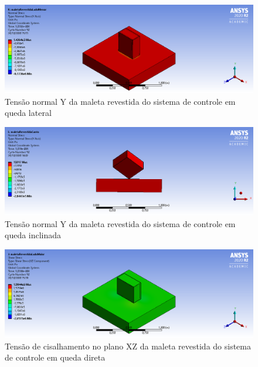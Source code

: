 \begin{apendicesenv}
\begin{figure}[htb]
    \centering
    \includegraphics[width=1.0\textwidth, angle=0]{figuras/estrutura_simulacaoImpacto/maletaRevestidaNormalYMenor.png}
    \caption{Tensão normal Y da maleta revestida do sistema de controle em queda lateral}
    \label{fig:simulacaoImpacto_29}
\end{figure}

\begin{figure}[htb]
    \centering
    \includegraphics[width=1.0\textwidth, angle=0]{figuras/estrutura_simulacaoImpacto/maletaRevestidaNormalYCanto.png}
    \caption{Tensão normal Y da maleta revestida do sistema de controle em queda inclinada}
    \label{fig:simulacaoImpacto_30}
\end{figure}

\begin{figure}[htb]
    \centering
    \includegraphics[width=1.0\textwidth, angle=0]{figuras/estrutura_simulacaoImpacto/maletaRevestidaCisalhamentoXZMaior.png}
    \caption{Tensão de cisalhamento no plano XZ da maleta revestida do sistema de controle em queda direta}
    \label{fig:simulacaoImpacto_31}
\end{figure}


\end{apendicesenv}
